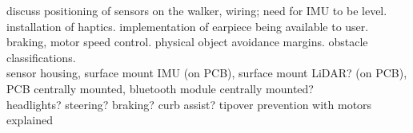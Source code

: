\noindent discuss positioning of sensors on the walker, wiring; need for IMU to be level. installation of haptics. implementation of earpiece being available to user. braking, motor speed control. physical object avoidance margins. obstacle classifications.\\

\noindent sensor housing, surface mount IMU (on PCB), surface mount LiDAR? (on PCB), PCB centrally mounted, bluetooth module centrally mounted?\\

\noindent headlights? steering? braking? curb assist? tipover prevention with motors explained\\